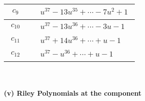 \documentclass[1p]{elsarticle_modified}
\theoremstyle{definition}
\begin{document}
\begin{tabular}{m{50pt}|m{274pt}}
\hline $$\begin{aligned}c_{9}\end{aligned}$$&$\begin{aligned}
&u^{37}-13 u^{35}+\cdots-7 u^2+1
\end{aligned}$\\
\hline $$\begin{aligned}c_{10}\end{aligned}$$&$\begin{aligned}
&u^{37}-13 u^{36}+\cdots-3 u-1
\end{aligned}$\\
\hline $$\begin{aligned}c_{11}\end{aligned}$$&$\begin{aligned}
&u^{37}+14 u^{36}+\cdots+u-1
\end{aligned}$\\
\hline $$\begin{aligned}c_{12}\end{aligned}$$&$\begin{aligned}
&u^{37}- u^{36}+\cdots+u-1
\end{aligned}$\\
\hline
\end{tabular}\\~\\
\newpage\renewcommand{\arraystretch}{1}
\flushleft \textbf{(v) Riley Polynomials at the component}\newline \\
\end{document}
